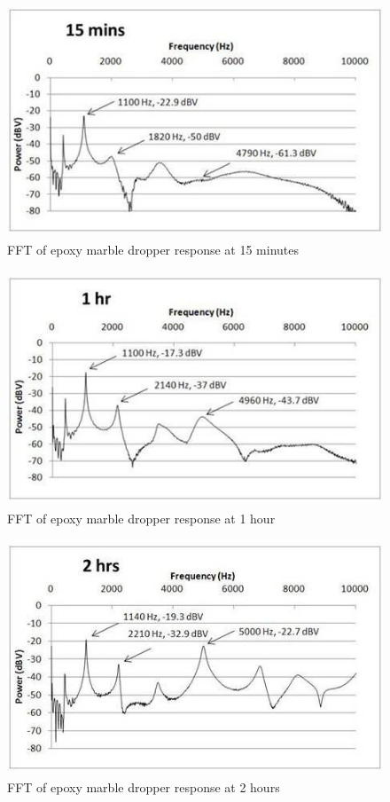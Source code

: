 \documentclass[]{aiaa-tc}%
\begin{document}
\begin{figure}[H]%
\centering
 \includegraphics[height = 7cm]{epoxy_15}
 \caption{FFT of epoxy marble dropper response at 15 minutes}
 \label{fig:epoxy_15}
\end{figure}

\begin{figure}[H]%
\centering
 \includegraphics[height = 7cm]{epoxy_1hr}
 \caption{FFT of epoxy marble dropper response at 1 hour}
 \label{fig:epoxy_1hr}
\end{figure}

\begin{figure}[H]%
\centering
 \includegraphics[height = 7cm]{epoxy_2hr}
 \caption{FFT of epoxy marble dropper response at 2 hours}
 \label{fig:epoxy_2hr}
\end{figure}
\end{document}
